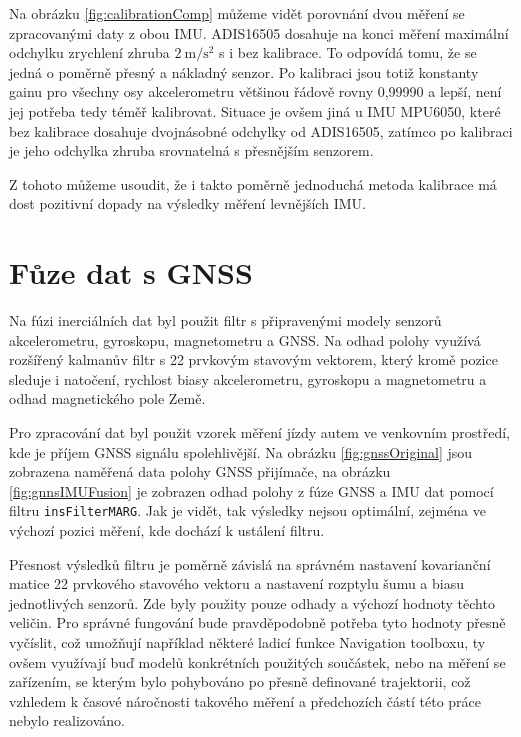 Na obrázku \ref{fig:calibrationComp} můžeme vidět porovnání dvou měření se zpracovanými daty z obou IMU. ADIS16505 dosahuje na konci měření maximální odchylku zrychlení zhruba $ \SI[per-mode = symbol]{2}{\metre\per\second\squared} $ s i bez kalibrace. To odpovídá tomu, že se jedná o poměrně přesný a nákladný senzor. Po kalibraci jsou totiž konstanty gainu pro všechny osy akcelerometru většinou řádově rovny 0,99990 a lepší, není jej potřeba tedy téměř kalibrovat. Situace je ovšem jiná u IMU MPU6050, které bez kalibrace dosahuje dvojnásobné odchylky od ADIS16505, zatímco po kalibraci je jeho odchylka zhruba srovnatelná s přesnějším senzorem.

Z tohoto můžeme usoudit, že i takto poměrně jednoduchá metoda kalibrace má dost pozitivní dopady na výsledky měření levnějších IMU.

\section{Fůze dat s GNSS}
Na fúzi inerciálních dat byl použit filtr s připravenými modely senzorů akcelerometru, gyroskopu, magnetometru a GNSS. Na odhad polohy využívá rozšířený kalmanův filtr s 22 prvkovým stavovým vektorem, který kromě pozice sleduje i natočení, rychlost biasy akcelerometru, gyroskopu a magnetometru a odhad magnetického pole Země. \cite{M7nvHLyk8N0V3ub2}

Pro zpracování dat byl použit vzorek měření jízdy autem ve venkovním prostředí, kde je  příjem GNSS signálu spolehlivější. Na obrázku \ref{fig:gnssOriginal} jsou zobrazena naměřená data polohy GNSS přijímače, na obrázku \ref{fig:gnnsIMUFusion} je zobrazen odhad polohy z fúze GNSS a IMU dat pomocí filtru \texttt{insFilterMARG}. Jak je vidět, tak výsledky nejsou optimální, zejména ve výchozí pozici měření, kde dochází k ustálení filtru.

Přesnost výsledků filtru je poměrně závislá na správném nastavení kovarianční matice 22 prvkového stavového vektoru a nastavení rozptylu šumu a biasu jednotlivých senzorů. Zde byly použity pouze odhady a výchozí hodnoty těchto veličin. Pro správné fungování bude pravděpodobně potřeba tyto hodnoty přesně vyčíslit, což umožňují například některé ladicí funkce Navigation toolboxu, ty ovšem využívají buď modelů konkrétních použitých součástek, nebo na měření se zařízením, se kterým bylo pohybováno po přesně definované trajektorii, což vzhledem k časové náročnosti takového měření a předchozích částí této práce nebylo realizováno.  

